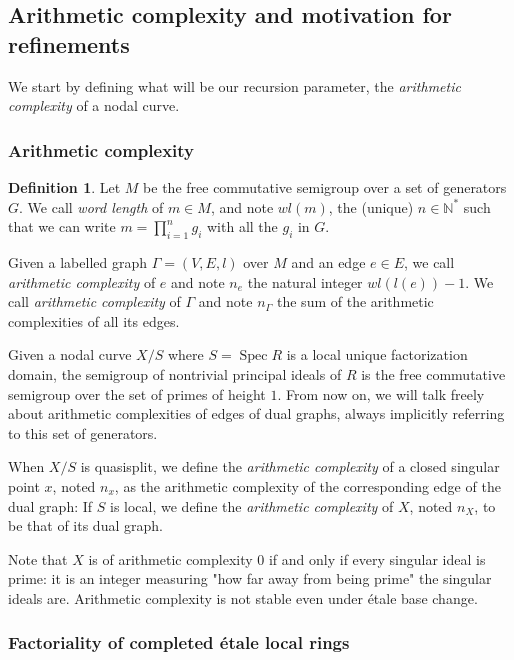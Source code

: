 \documentclass[a4paper,10pt,twoside]{article}
\newcommand{\N}{\mathbb{N}}
\DeclareMathOperator{\spec}{Spec}
\theoremstyle{definition}
\newtheorem{defi}[thm]{Definition}
\theoremstyle{remark}
\begin{document}
\subsection{Arithmetic complexity and motivation for refinements}
 We start by defining what will be our recursion parameter, the \emph{arithmetic complexity} of a nodal curve.

\subsubsection{Arithmetic complexity}

\begin{defi}\label{complexité arithmétique}
	Let $M$ be the free commutative semigroup over a set of generators $G$. We call \emph{word length} of $m\in M$, and note $wl(m)$, the (unique) $n\in\N^*$ such that we can write $m=\prod\limits_{i=1}^n g_i$ with all the $g_i$ in $G$.
	
	Given a labelled graph $\Gamma=(V,E,l)$ over $M$ and an edge $e\in E$, we call \emph{arithmetic complexity} of $e$ and note $n_e$ the natural integer $wl(l(e))-1$. We call \emph{arithmetic complexity} of $\Gamma$ and note $n_\Gamma$ the sum of the arithmetic complexities of all its edges.

	Given a nodal curve $X/S$ where $S=\spec R$ is a local unique factorization domain, the semigroup of nontrivial principal ideals of $R$ is the free commutative semigroup over the set of primes of height $1$. From now on, we will talk freely about arithmetic complexities of edges of dual graphs, always implicitly referring to this set of generators.
	
	When $X/S$ is quasisplit, we define the \emph{arithmetic complexity} of a closed singular point $x$, noted $n_x$, as the arithmetic complexity of the corresponding edge of the dual graph: If $S$ is local, we define the \emph{arithmetic complexity} of $X$, noted $n_X$, to be that of its dual graph.
	
	Note that $X$ is of arithmetic complexity $0$ if and only if every singular ideal is prime: it is an integer measuring "how far away from being prime" the singular ideals are. Arithmetic complexity is not stable even under \'etale base change.
\end{defi}

\subsubsection{Factoriality of completed \'etale local rings}
\end{document}
